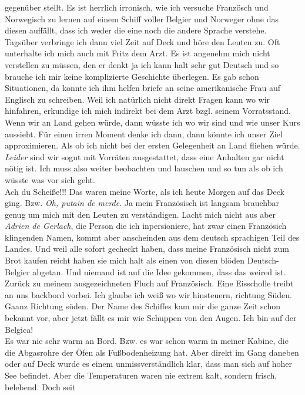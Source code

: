 \documentclass{article}
\begin{document}
gegenüber stellt. Es ist herrlich irronisch, wie ich versuche Französch und Norwegisch zu lernen auf einem
Schiff voller Belgier und Norweger ohne das diesen auffällt, dass ich weder die eine noch die andere Sprache
verstehe.
\\
\noindent 
Tagsüber verbringe ich dann viel Zeit auf Deck und höre den Leuten zu. Oft unterhalte ich mich auch mit Fritz
dem Arzt. Es ist angenehm mich nicht verstellen zu müssen,
den er denkt ja ich kann halt sehr gut Deutsch und so brauche ich mir keine komplizierte Geschichte überlegen.
Es gab schon Situationen, da konnte ich ihm helfen briefe an seine amerikanische Frau auf Englisch zu schreiben.
Weil ich natürlich nicht direkt Fragen kann wo wir hinfahren, erkundige ich mich indirekt bei dem Arzt bzgl.
seinem Vorratsstand. Wenn wir an Land gehen würde, dann wüsste ich wo wir sind und wie unser Kurs aussieht.
Für einen irren Moment denke ich dann, dann könnte ich unser Ziel approximieren. Als ob ich nicht bei der ersten
Gelegenheit an Land fliehen würde. \textit{Leider} sind wir sogut mit Vorräten ausgestattet, dass eine Anhalten
gar nicht nötig ist. Ich muss also weiter beobachten und lauschen und so tun als ob ich wüsste was vor sich
geht.
\\
\noindent Ach du Scheiße!!! Das waren meine Worte, als ich heute Morgen auf das Deck ging. Bzw. \textit{Oh, putain de
  merde}.
Ja mein Französisch ist langsam brauchbar genug um mich mit den Leuten zu verständigen. Lacht
mich nicht aus aber \textit{Adrien de Gerlach}, die Person die ich inpersioniere, hat zwar einen Französich
klingenden Namen, kommt aber anscheinden aus dem deutsch sprachigen Teil des Landes. Und weil alle sofort
gecheckt
haben, dass meine Französisch nicht zum Brot kaufen reicht haben sie mich halt als einen von diesen blöden
Deutsch-Belgier abgetan. Und niemand ist auf die Idee gekommen, dass das weired ist. Zurück zu meinem
ausgezeichneten Fluch auf Französisch. Eine Eisscholle treibt an uns backbord vorbei. Ich glaube ich weiß wo wir
hinsteuern, richtung Süden. Gaanz Richtung süden. Der Name des Schiffes kam mir die ganze Zeit schon bekannt
vor, aber jetzt fällt es mir wie Schuppen von den Augen. Ich bin auf der Belgica!
\\
\noindent Es war nie sehr warm an Bord. Bzw. es war schon warm in meiner Kabine, die die Abgasrohre der Öfen als
Fußbodenheizung hat. Aber direkt im Gang daneben oder auf Deck wurde es einem unmissverständlich klar, dass man
sich auf hoher See befindet. Aber die Temperaturen waren nie extrem kalt, sondern frisch, belebend. Doch seit
\end{document}
